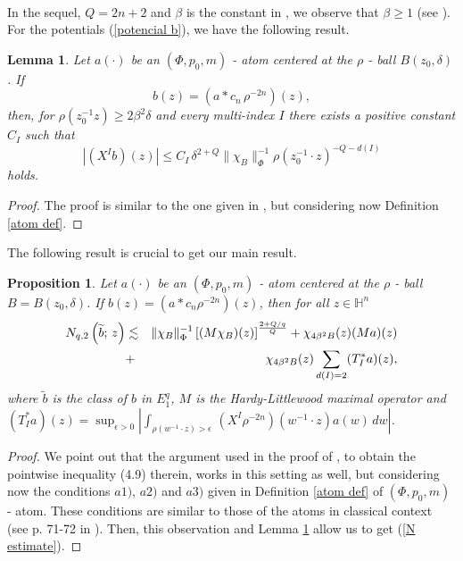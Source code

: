 \documentclass[oneside,10pt]{article}
\newtheorem{lemma}[theorem]{Lemma}
\newtheorem{proposition}[theorem]{Proposition}
\begin{document}
\

In the sequel, $Q = 2n+2$ and $\beta$ is the constant in \cite[Corollary 1.44]{Foll-St}, we observe that $\beta \geq 1$ 
(see \cite[p. 29]{Foll-St}). For the potentials (\ref{potencial b}), we have the following result.

\begin{lemma} \label{a conv ro} Let $a(\cdot)$ be an $(\Phi, p_{0}, m)$ - atom centered at the $\rho$ - ball $B(z_0, \delta)$. If 
\[
b(z) = \left( a \ast c_n \, \rho^{-2n} \right)(z),
\]
then, for $\rho(z_0^{-1} z) \geq 2 \beta^{2}\delta$ and every multi-index $I$ there exists a positive constant $C_{I}$ such that 
\[
\left| (X^{I}b)(z) \right| \leq C_{I} \, \delta^{2+Q} \| \chi_B \|^{-1}_{\Phi} \rho(z_{0}^{-1} \cdot z)^{-Q-d(I)}
\]
holds.
\end{lemma}

\begin{proof} 
The proof is similar to the one given in \cite[Lemma 4.11]{rocha3}, but considering now Definition \ref{atom def}. 
\end{proof}

The following result is crucial to get our main result.

\begin{proposition} \label{pointwise estimate} Let $a(\cdot)$ be an $(\Phi, p_{0}, m)$ - atom centered at the $\rho$ - ball 
$B=B(z_0, \delta)$. If $b(z) = (a \ast c_n \rho^{-2n})(z)$, then for all $z \in \mathbb{H}^{n}$
\begin{eqnarray} 
\label{N estimate}
N_{q, 2} \left(\widetilde{b}; \, z \right) &\lesssim& \| \chi_B \|^{-1}_{\Phi} \left[(M \chi_{B})(z) \right]^{\frac{2 + Q/q}{Q}} + 
\chi_{4 \beta^2 B}(z) (M a)(z)  \\
\notag
&+& \chi_{4 \beta^2 B}(z) \sum_{d(I)=2} (T^{*}_{I} a)(z),
\end{eqnarray}
where $\widetilde{b}$ is the class of $b$ in $E^{q}_{1}$, $M$ is the Hardy-Littlewood maximal operator and $(T^{*}_{I} a) (z) = \sup_{\epsilon >0} \left|\int_{\rho(w^{-1} \cdot z) > \epsilon} \, (X^{I} \rho^{-2n})(w^{-1} \cdot z) a(w) \, dw \right|$.
\end{proposition}

\begin{proof} We point out that the argument used in the proof of \cite[Proposition 4.12]{rocha3}, to obtain the pointwise inequality
(4.9) therein, works in this setting as well, but considering now the conditions $a1)$, $a2)$ and $a3)$ given in Definition 
\ref{atom def} of $(\Phi, p_0, m)$ - atom. These conditions are similar to those of the atoms in classical context (see p. 71-72 
in \cite{Foll-St}). Then, this observation and Lemma \ref{a conv ro} allow us to get (\ref{N estimate}).
\end{proof}
\end{document}
